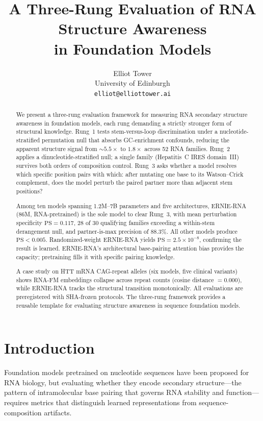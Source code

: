 \documentclass[11pt]{article}
\title{A Three-Rung Evaluation of RNA Structure Awareness\\
  in Foundation Models}
\author{Elliot Tower\\
  University of Edinburgh\\
  \texttt{elliot@elliottower.ai}}
\begin{document}
\maketitle

\begin{abstract}
We present a three-rung evaluation framework for measuring RNA
secondary structure awareness in foundation models, each rung demanding
a strictly stronger form of structural knowledge.  Rung~1 tests
stem-versus-loop discrimination under a nucleotide-stratified
permutation null that absorbs GC-enrichment confounds, reducing the
apparent structure signal from ${\sim}5.5\times$ to $1.8\times$ across
52 RNA families.  Rung~2 applies a dinucleotide-stratified null; a
single family (Hepatitis~C IRES domain~III) survives both orders of
composition control.  Rung~3 asks whether a model resolves which
specific position pairs with which: after mutating one base to its
Watson--Crick complement, does the model perturb the paired partner
more than adjacent stem positions?

Among ten models spanning 1.2M--7B parameters and five architectures,
ERNIE-RNA (86M, RNA-pretrained) is the sole model to clear Rung~3,
with mean perturbation specificity $\mathrm{PS} = 0.117$, 28 of 30
qualifying families exceeding a within-stem derangement null, and
partner-is-max precision of 88.3\%.  All other models produce
$\mathrm{PS} < 0.005$.  Randomized-weight ERNIE-RNA yields
$\mathrm{PS} = 2.5 \times 10^{-8}$, confirming the result is learned.
ERNIE-RNA's architectural base-pairing attention bias provides the
capacity; pretraining fills it with specific pairing knowledge.

A case study on HTT mRNA CAG-repeat alleles (six models, five clinical
variants) shows RNA-FM embeddings collapse across repeat counts
(cosine distance $= 0.000$), while ERNIE-RNA tracks the structural
transition monotonically.  All evaluations are preregistered with
SHA-frozen protocols.  The three-rung framework provides a reusable
template for evaluating structure awareness in sequence foundation
models.
\end{abstract}


\section{Introduction}
\label{sec:intro}

Foundation models pretrained on nucleotide sequences have been
proposed for RNA biology, but evaluating whether they encode secondary
structure---the pattern of intramolecular base pairing that governs
RNA stability and function---requires metrics that distinguish learned
representations from sequence-composition artifacts.
\end{document}
